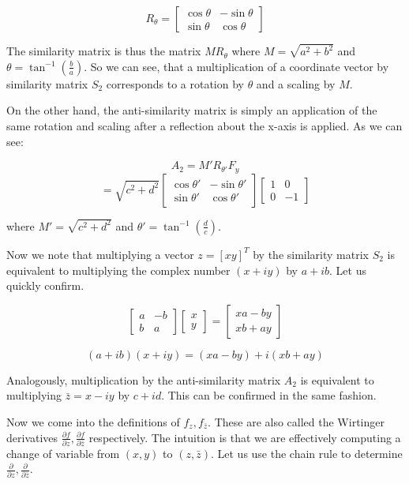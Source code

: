 $$R_{\theta} = \begin{bmatrix}
\cos \theta & -\sin \theta \\
\sin \theta & \cos \theta 
\end{bmatrix}$$

The similarity matrix is thus the matrix $M R_{\theta}$ where $M = \sqrt{a^2 + b^2}$ and $\theta = \tan^{-1}\left( \frac{b}{a} \right)$. So we can see, that a multiplication of a coordinate vector by similarity matrix $S_2$ corresponds to a rotation by $\theta$ and a scaling by $M$. 

On the other hand, the anti-similarity matrix is simply an application of the same rotation and scaling after a reflection about the x-axis is applied. As we can see:

$$A_2 = M' R_{\theta'} F_y$$
$$= \sqrt{c^2 + d^2} \begin{bmatrix}
\cos \theta' & -\sin \theta' \\
\sin \theta' & \cos \theta' 
\end{bmatrix} \begin{bmatrix}
1 & 0 \\ 
0 & -1
\end{bmatrix}$$ 

where $M' = \sqrt{c^2 + d^2}$ and $\theta' = \tan^{-1} \left(\frac{d}{c}\right)$. 


Now we note that multiplying a vector $z = [x y]^T$ by the similarity matrix $S_2$ is equivalent to multiplying the complex number $(x + iy)$ by $a + ib$. Let us quickly confirm.

$$\begin{bmatrix}a & -b \\ b & a \end{bmatrix} \begin{bmatrix} x \\ y \end{bmatrix} = \begin{bmatrix} xa-by \\ xb + ay \end{bmatrix}$$

$$(a+ib)(x+iy) = (xa-by) + i(xb+ay)$$

Analogously, multiplication by the anti-similarity matrix $A_2$ is equivalent to multiplying $\bar{z} = x-iy$ by $c+id$. This can be confirmed in the same fashion.

Now we come into the definitions of $f_z, f_{\bar{z}}$. These are also called the Wirtinger derivatives $\frac{\partial f}{\partial z}, \frac{\partial f}{\partial \bar{z}}$ respectively. The intuition is that we are effectively computing a change of variable from $(x,y)$ to $(z,\bar{z})$. Let us use the chain rule to determine $\frac{\partial}{\partial z}, \frac{\partial}{\partial \bar{z}}$. 

